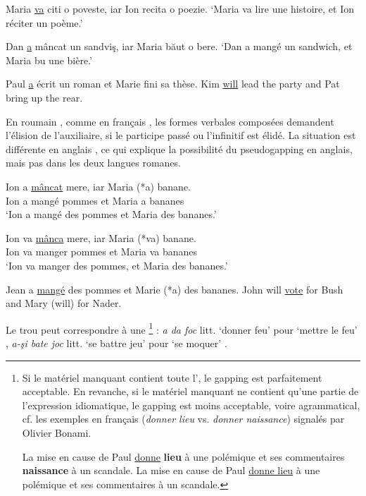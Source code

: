 \ea \label{ch2:ex76}
\ea *Maria \uline{va} citi o poveste, iar Ion recita o poezie.
\glt ‘Maria va lire une histoire, et Ion réciter un poème.’  

\ex *Dan \uline{a} mâncat un sandviş, iar Maria băut o bere.
\glt ‘Dan a mangé un sandwich, et Maria bu une bière.’  
\z
\z

\ea
\ea Paul \uline{a} écrit un roman et Marie fini sa thèse. \label{ch2:ex77a}         
\ex Kim \uline{will} lead the party and Pat bring up the rear. \label{ch2:ex77b}         
\z
\z

En roumain , comme en français , les formes verbales composées demandent l’élision de l’auxiliaire, si le participe passé ou l’infinitif est élidé. La situation est différente en anglais , ce qui explique la possibilité du pseudogap\-ping en anglais, mais pas dans les deux langues romanes. 

\ea \label{ch2:ex78}
\ea 
\gll Ion  a  \uline{mâncat}  mere,  iar  Maria  (*a)  banane.\\
Ion  a  mangé  pommes  et  Maria  a  bananes\\
\glt ‘Ion a mangé des pommes et Maria des bananes.’  

\ex 
\gll Ion  va  \uline{mânca}  mere,  iar  Maria  (*va)  banane.\\
Ion  va  manger  pommes  et  Maria  va  bananes\\
\glt ‘Ion va manger des pommes, et Maria des bananes.’
\z
\z


\ea
\ea Jean a \uline{mangé} des pommes et Marie (*a) des bananes. \label{ch2:ex79a}         
\ex John will \uline{vote} for Bush and Mary (will) for Nader. \label{ch2:ex79b}
\z
\z

Le trou peut correspondre à une \footnote{
 Si le matériel manquant contient toute l’, le gapping est parfaitement acceptable. En revanche, si le matériel manquant ne contient qu’une partie de l’expression idiomatique, le gapping est moins acceptable, voire agrammatical, cf. les exemples  en français (\textit{donner lieu} vs. \textit{donner naissance}) signalés par Olivier Bonami.

\ea \label{ch2:foot27i}
\ea *La mise en cause de Paul \uline{donne} \textbf{lieu} à une polémique et ses commentaires \textbf{naissance} à un scandale.
\ex La mise en cause de Paul \uline{donne lieu} à une polémique et ses commentaires à un scandale.
\z
\z
} : \textit{a da foc} litt. ‘donner feu’ pour ‘mettre le feu’ , \textit{a-şi bate joc} litt. ‘se battre jeu’ pour ‘se moquer’ .

